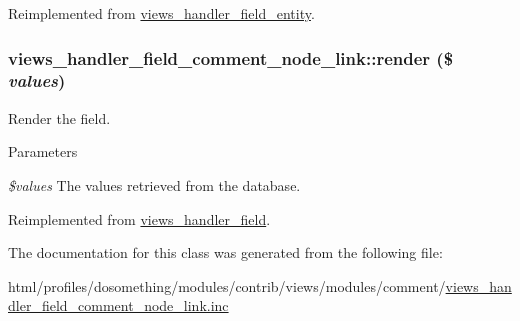 Reimplemented from \hyperlink{classviews__handler__field__entity_a71638207b6bd704ef4222b61f150c4af}{views\_\-handler\_\-field\_\-entity}.\hypertarget{classviews__handler__field__comment__node__link_a57a6cd4b57779b44220bc89f48c86ee6}{
\subsubsection[{render}]{\setlength{\rightskip}{0pt plus 5cm}views\_\-handler\_\-field\_\-comment\_\-node\_\-link::render (\$ {\em values})}}
\label{classviews__handler__field__comment__node__link_a57a6cd4b57779b44220bc89f48c86ee6}
Render the field.


\begin{DoxyParams}{Parameters}
\item[{\em \$values}]The values retrieved from the database. \end{DoxyParams}


Reimplemented from \hyperlink{classviews__handler__field_a82ff951c5e9ceb97b2eab86f880cbc1e}{views\_\-handler\_\-field}.

The documentation for this class was generated from the following file:\begin{DoxyCompactItemize}
\item 
html/profiles/dosomething/modules/contrib/views/modules/comment/\hyperlink{views__handler__field__comment__node__link_8inc}{views\_\-handler\_\-field\_\-comment\_\-node\_\-link.inc}\end{DoxyCompactItemize}
